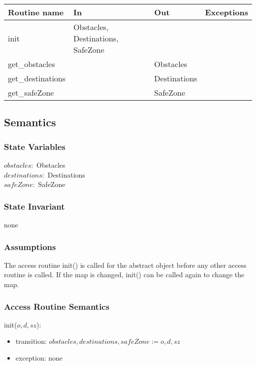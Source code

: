 \documentclass[12pt]{article}
\begin{document}
\begin{tabular}{| l | l | l | l |}
\hline
\textbf{Routine name} & \textbf{In} & \textbf{Out} & \textbf{Exceptions}\\
\hline
init & Obstacles, Destinations, SafeZone & ~ & ~\\
\hline
get\_obstacles & ~ & Obstacles & ~\\
\hline
get\_destinations & ~ & Destinations & ~\\
\hline
get\_safeZone & ~ & SafeZone & ~\\
\hline

\end{tabular}

\subsection* {Semantics}

\subsubsection*{State Variables}
$\mathit{obstacles}:$ Obstacles\\
$\mathit{destinations}:$ Destinations\\
$\mathit{safeZone}:$ SafeZone

\subsubsection* {State Invariant}
none

\subsubsection* {Assumptions}
The access routine init() is called for the abstract object before any other access routine is called.  If the map is
changed, init() can be called again to change the map.

\subsubsection* {Access Routine Semantics}

\noindent init($o, d, sz$):
\begin{itemize}
\item transition: $\mathit{obstacles}, \mathit{destinations}, \mathit{safeZone}  := o, d, sz$
\item exception: none
\end{itemize}
\end{document}
